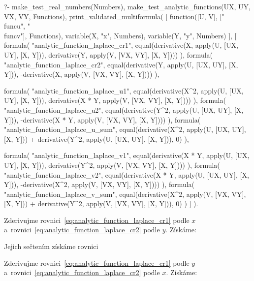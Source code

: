 \begin{prolog}
?-	make_test_real_numbers(Numbers),
	make_test_analytic_functions(UX, UY, VX, VY, Functions),
	print_validated_multiformula(
		[
			function([U, V], ["\\func{u}", "\\func{v}"], Functions),
			variable(X, "x", Numbers),
			variable(Y, "y", Numbers)
		],
		[
			formula(
				"analytic_function_laplace_cr1",
				equal(derivative(X, apply(U, [UX, UY], [X, Y])), derivative(Y, apply(V, [VX, VY], [X, Y])))
			),
			formula(
				"analytic_function_laplace_cr2",
				equal(derivative(Y, apply(U, [UX, UY], [X, Y])), -derivative(X, apply(V, [VX, VY], [X, Y])))
			),
			
			formula(
				"analytic_function_laplace_u1",
				equal(derivative(X^2, apply(U, [UX, UY], [X, Y])), derivative(X * Y, apply(V, [VX, VY], [X, Y])))
			),
			formula(
				"analytic_function_laplace_u2",
				equal(derivative(Y^2, apply(U, [UX, UY], [X, Y])), -derivative(X * Y, apply(V, [VX, VY], [X, Y])))
			),
			formula(
				"analytic_function_laplace_u_sum",
				equal(derivative(X^2, apply(U, [UX, UY], [X, Y])) + derivative(Y^2, apply(U, [UX, UY], [X, Y])), 0)
			),
			
			formula(
				"analytic_function_laplace_v1",
				equal(derivative(X * Y, apply(U, [UX, UY], [X, Y])), derivative(Y^2, apply(V, [VX, VY], [X, Y])))
			),
			formula(
				"analytic_function_laplace_v2",
				equal(derivative(X * Y, apply(U, [UX, UY], [X, Y])), -derivative(X^2, apply(V, [VX, VY], [X, Y])))
			),
			formula(
				"analytic_function_laplace_v_sum",
				equal(derivative(X^2, apply(V, [VX, VY], [X, Y])) + derivative(Y^2, apply(V, [VX, VY], [X, Y])), 0)
			)
		]
	).
\end{prolog}


Zderivujme rovnici~\eqref{eq:analytic_function_laplace_cr1} podle \(x\) a~rovnici~\eqref{eq:analytic_function_laplace_cr2} podle \(y\). Získáme:


Jejich sečtením získáme rovnici


Zderivujme rovnici~\eqref{eq:analytic_function_laplace_cr1} podle \(y\) a~rovnici~\eqref{eq:analytic_function_laplace_cr2} podle \(x\). Získáme:

